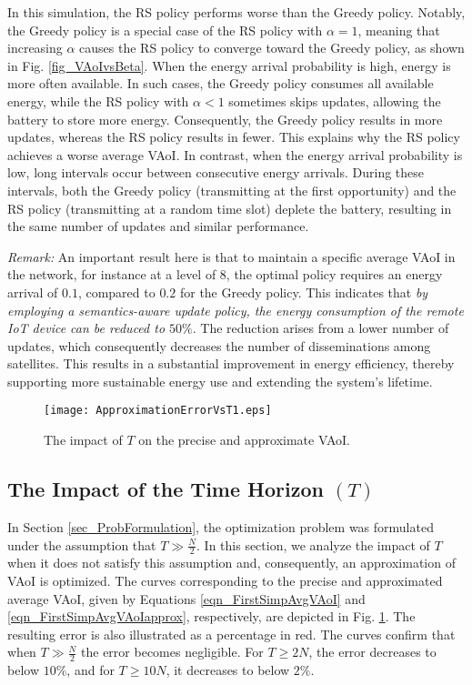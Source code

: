 \documentclass[lettersize,journal]{IEEEtran}
\begin{document}
    In this simulation, the RS policy performs worse than the Greedy policy. Notably, the Greedy policy is a special case of the RS policy with $\alpha = 1$, meaning that increasing $\alpha$ causes the RS policy to converge toward the Greedy policy, as shown in Fig. \ref{fig_VAoIvsBeta}. When the energy arrival probability is high, energy is more often available. In such cases, the Greedy policy consumes all available energy, while the RS policy with $\alpha < 1$ sometimes skips updates, allowing the battery to store more energy. Consequently, the Greedy policy results in more updates, whereas the RS policy results in fewer. This explains why the RS policy achieves a worse average VAoI. In contrast, when the energy arrival probability is low, long intervals occur between consecutive energy arrivals. During these intervals, both the Greedy policy (transmitting at the first opportunity) and the RS policy (transmitting at a random time slot) deplete the battery, resulting in the same number of updates and similar performance.

    \textit{Remark:} An important result here is that to maintain a specific average VAoI in the network, for instance at a level of $8$, the optimal policy requires an energy arrival of $0.1$, compared to $0.2$ for the Greedy policy. This indicates that \emph{by employing a semantics-aware update policy, the energy consumption of the remote IoT device can be reduced to $50\%$}. The reduction arises from a lower number of updates, which consequently decreases the number of disseminations among satellites. This results in a substantial improvement in energy efficiency, thereby supporting more sustainable energy use and extending the system's lifetime.

    \begin{figure}[tb!]
		\centering
		\texttt{[image: ApproximationErrorVsT1.eps]}
		\caption{The impact of $T$ on the precise and approximate VAoI.}
        \vspace{-8pt}
		\label{fig_ApproxError}
	\end{figure}

    \subsection{The Impact of the Time Horizon $(T)$}
    In Section \ref{sec_ProbFormulation}, the optimization problem was formulated under the assumption that $T \gg \frac{N}{2}$. In this section, we analyze the impact of $T$ when it does not satisfy this assumption and, consequently, an approximation of VAoI is optimized. The curves corresponding to the precise and approximated average VAoI, given by Equations \eqref{eqn_FirstSimpAvgVAoI} and \eqref{eqn_FirstSimpAvgVAoIapprox}, respectively, are depicted in Fig. \ref{fig_ApproxError}. The resulting error is also illustrated as a percentage in red. The curves confirm that when $T \gg \frac{N}{2}$ the error becomes negligible. For $T \geq 2N$, the error decreases to below $10\%$, and for $T \geq 10N$, it decreases to below $2\%$.
\end{document}
